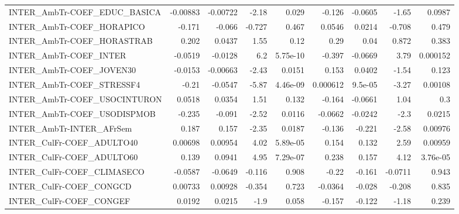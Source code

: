 \begin{tabular}{lrrrrrrrr}
INTER\_AmbTr-COEF\_EDUC\_BASICA          &    -0.00883 &     -0.00722 &    -2.18 &    0.029 &     -0.126 &     -0.0605 &        -1.65 &        0.0987 \\
INTER\_AmbTr-COEF\_HORAPICO             &      -0.171 &       -0.066 &   -0.727 &    0.467 &     0.0546 &      0.0214 &       -0.708 &         0.479 \\
INTER\_AmbTr-COEF\_HORASTRAB            &       0.202 &       0.0437 &     1.55 &     0.12 &       0.29 &        0.04 &        0.872 &         0.383 \\
INTER\_AmbTr-COEF\_INTER                &     -0.0519 &      -0.0128 &      6.2 & 5.75e-10 &     -0.397 &     -0.0669 &         3.79 &      0.000152 \\
INTER\_AmbTr-COEF\_JOVEN30              &     -0.0153 &     -0.00663 &    -2.43 &   0.0151 &      0.153 &      0.0402 &        -1.54 &         0.123 \\
INTER\_AmbTr-COEF\_STRESSF4             &       -0.21 &      -0.0547 &    -5.87 & 4.46e-09 &   0.000612 &     9.5e-05 &        -3.27 &       0.00108 \\
INTER\_AmbTr-COEF\_USOCINTURON          &      0.0518 &       0.0354 &     1.51 &    0.132 &     -0.164 &     -0.0661 &         1.04 &           0.3 \\
INTER\_AmbTr-COEF\_USODISPMOB           &      -0.235 &       -0.091 &    -2.52 &   0.0116 &    -0.0662 &     -0.0242 &         -2.3 &        0.0215 \\
INTER\_AmbTr-INTER\_AFrSem              &       0.187 &        0.157 &    -2.35 &   0.0187 &     -0.136 &      -0.221 &        -2.58 &       0.00976 \\
INTER\_CulFr-COEF\_ADULTO40             &     0.00698 &      0.00954 &     4.02 & 5.89e-05 &      0.154 &       0.132 &         2.59 &       0.00959 \\
INTER\_CulFr-COEF\_ADULTO60             &       0.139 &       0.0941 &     4.95 & 7.29e-07 &      0.238 &       0.157 &         4.12 &      3.76e-05 \\
INTER\_CulFr-COEF\_CLIMASECO            &     -0.0587 &      -0.0649 &   -0.116 &    0.908 &      -0.22 &      -0.161 &      -0.0711 &         0.943 \\
INTER\_CulFr-COEF\_CONGCD               &     0.00733 &      0.00928 &   -0.354 &    0.723 &    -0.0364 &      -0.028 &       -0.208 &         0.835 \\
INTER\_CulFr-COEF\_CONGEF               &      0.0192 &       0.0215 &     -1.9 &    0.058 &     -0.157 &      -0.122 &        -1.18 &         0.239 \\

\end{tabular}
